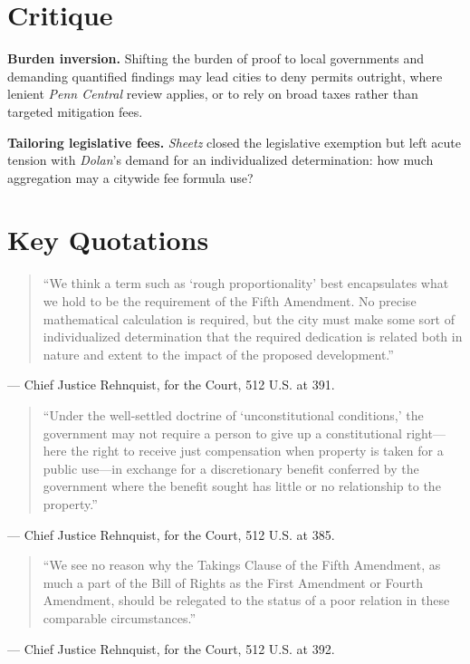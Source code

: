 \documentclass[12pt]{article}
\begin{document}
\section{Critique}

\textbf{Burden inversion.} Shifting the burden of proof to local governments and demanding quantified findings may lead cities to deny permits outright, where lenient \textit{Penn Central} review applies, or to rely on broad taxes rather than targeted mitigation fees.

\textbf{Tailoring legislative fees.} \textit{Sheetz} closed the legislative exemption but left acute tension with \textit{Dolan}'s demand for an individualized determination: how much aggregation may a citywide fee formula use?

\section{Key Quotations}

\begin{quote}
``We think a term such as `rough proportionality' best encapsulates what we hold to be the requirement of the Fifth Amendment. No precise mathematical calculation is required, but the city must make some sort of individualized determination that the required dedication is related both in nature and extent to the impact of the proposed development.''
\end{quote}
\noindent --- Chief Justice Rehnquist, for the Court, 512 U.S. at 391.

\begin{quote}
``Under the well-settled doctrine of `unconstitutional conditions,' the government may not require a person to give up a constitutional right---here the right to receive just compensation when property is taken for a public use---in exchange for a discretionary benefit conferred by the government where the benefit sought has little or no relationship to the property.''
\end{quote}
\noindent --- Chief Justice Rehnquist, for the Court, 512 U.S. at 385.

\begin{quote}
``We see no reason why the Takings Clause of the Fifth Amendment, as much a part of the Bill of Rights as the First Amendment or Fourth Amendment, should be relegated to the status of a poor relation in these comparable circumstances.''
\end{quote}
\noindent --- Chief Justice Rehnquist, for the Court, 512 U.S. at 392.
\end{document}
